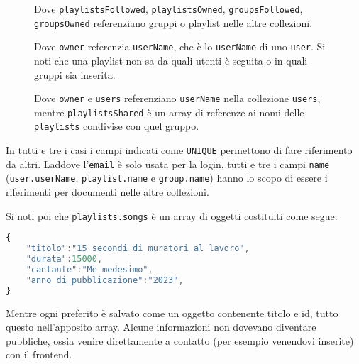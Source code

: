 \begin{figure}[h]
    \begin{minipage}{.30\textwidth}
        Dove \verb|playlistsFollowed|, \verb|playlistsOwned|, \verb|groupsFollowed|, \verb|groupsOwned| referenziano gruppi o playlist nelle altre collezioni.
    \end{minipage}
    \hfill
    \begin{minipage}{.30\textwidth}
        Dove \verb|owner| referenzia \verb|userName|, che è lo \verb|userName| di uno \verb|user|. Si noti che una playlist non sa da quali utenti è seguita o in quali gruppi sia inserita.
    \end{minipage}
    \hfill
    \begin{minipage}{.30\textwidth}
        Dove \verb|owner| e \verb|users| referenziano \verb|userName| nella collezione \verb|users|, mentre \verb|playlistsShared| è un array di referenze ai nomi delle \verb|playlists| condivise con quel gruppo.
    \end{minipage}
\end{figure}
In tutti e tre i casi i campi indicati come \verb|UNIQUE| permettono di fare riferimento da altri. Laddove l'\verb|email| è solo usata per la login, tutti e tre i campi \verb|name| (\verb|user.userName|, \verb|playlist.name| e \verb|group.name|) hanno lo scopo di essere i riferimenti per documenti nelle altre collezioni.

Si noti poi che \verb|playlists.songs| è un array di oggetti costituiti come segue:
\begin{lstlisting}[language=JavaScript]
{
    "titolo":"15 secondi di muratori al lavoro",
    "durata":15000,
    "cantante":"Me medesimo",
    "anno_di_pubblicazione":"2023",
}
\end{lstlisting}
Mentre ogni preferito è salvato come un oggetto contenente titolo e id, tutto questo nell'apposito array.
Alcune informazioni non dovevano diventare pubbliche, ossia venire direttamente a contatto (per esempio venendovi inserite) con il frontend.

